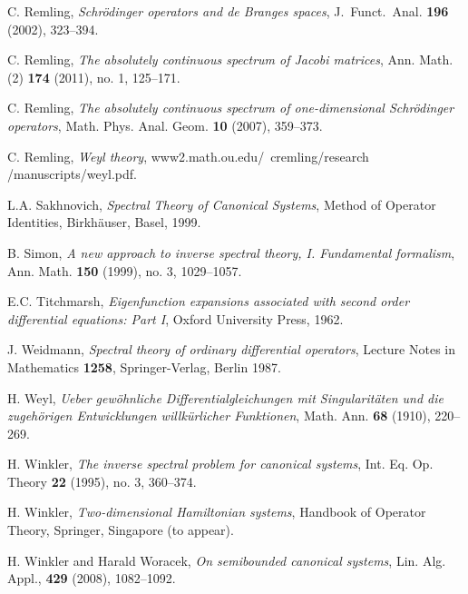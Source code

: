 \documentclass[preprint,12pt]{elsarticle}
\begin{document}
\begin{thebibliography}{10000}
 C. Remling, \textit{Schr\"odinger operators and de Branges spaces}, J.\ Funct.\ Anal. \textbf{196} (2002), 323--394.

 C. Remling, \textit{The absolutely continuous spectrum of Jacobi matrices}, Ann. Math. (2) \textbf{174} (2011), no. 1, 125--171. 

 C. Remling, \textit{The absolutely continuous spectrum of one-dimensional Schr\"odinger operators},
Math.  Phys. Anal. Geom. \textbf{10} (2007), 359--373.

 C. Remling, \textit{Weyl theory}, www2.math.ou.edu/~cremling/research
/manuscripts/weyl.pdf.

 L.A. Sakhnovich, \textit{Spectral Theory of Canonical Systems}, Method of Operator Identities, Birkh\"auser, Basel, 1999.

 B. Simon, \textit{A new approach to inverse spectral theory, I. Fundamental formalism}, Ann. Math. \textbf{150} (1999), no. 3, 1029--1057.

 E.C. Titchmarsh, \textit{Eigenfunction expansions associated with second order differential equations: Part I}, Oxford University Press, 1962.

 J. Weidmann, \textit{Spectral theory of ordinary differential operators}, Lecture Notes in Mathematics \textbf{1258}, Springer-Verlag, Berlin 1987.

 H. Weyl, \textit{Ueber gew\"ohnliche Differentialgleichungen mit Singularit\"aten und die zugeh\"origen Entwicklungen willk\"urlicher Funktionen}, Math. Ann. \textbf{68} (1910), 220--269.

 H. Winkler, \textit{The inverse spectral problem for canonical systems}, Int. Eq. Op. Theory \textbf{22} (1995), no. 3, 360--374.

 H. Winkler, \textit{Two-dimensional Hamiltonian systems}, Handbook of Operator Theory, Springer, Singapore (to appear). 

 H. Winkler and Harald Woracek, \textit{On semibounded canonical systems}, Lin. Alg. Appl., \textbf{429} (2008), 1082--1092.
\end{thebibliography}
\end{document}
